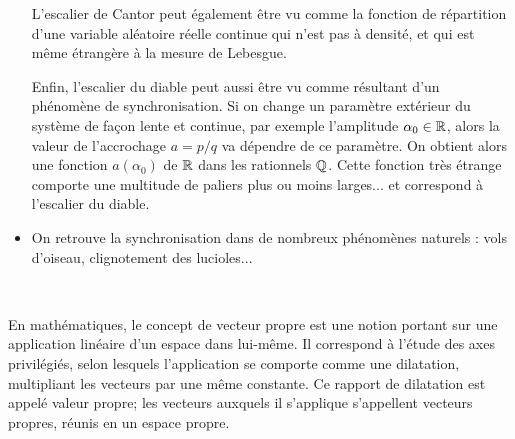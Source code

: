 \begin{itemize}
	L'escalier de Cantor peut également être vu comme la fonction de répartition d'une variable 
	aléatoire réelle continue qui n'est pas à densité, et qui est même étrangère à la 
	mesure de Lebesgue. 

	Enfin, l'escalier du diable peut aussi être vu comme résultant d'un phénomène de 
	synchronisation.
	Si on change un paramètre extérieur du système de façon lente et continue, par
	exemple l'amplitude $\alpha_0\in\mathbb R$, alors la valeur de l'accrochage $a=p/q$ va dépendre de
	ce paramètre. On obtient alors une fonction $a(\alpha_0)$ de $\mathbb R$ dans les rationnels $\mathbb Q$. 
	Cette fonction très étrange comporte une multitude de paliers plus ou moins larges... et correspond
	à l'escalier du diable.
	
   \item On retrouve la synchronisation dans de nombreux phénomènes naturels : vols d'oiseau, 
	clignotement des lucioles...
\end{itemize}\

\medskip
En mathématiques, le concept de vecteur propre est une notion portant sur une 
application linéaire d'un espace dans lui-même. Il correspond à l'étude des axes privilégiés, selon 
lesquels l'application se comporte comme une dilatation, multipliant les vecteurs par une même constante. 
Ce rapport de dilatation est appelé valeur propre; les vecteurs auxquels il s'applique s'appellent 
vecteurs propres, réunis en un espace propre.


